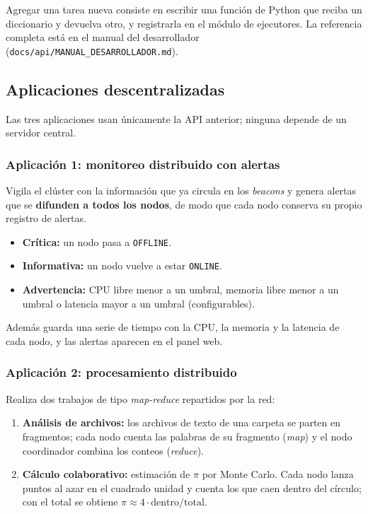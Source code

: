 \documentclass{article}
\begin{document}
Agregar una tarea nueva consiste en escribir una función de Python que reciba un diccionario y
devuelva otro, y registrarla en el módulo de ejecutores. La referencia completa está en el manual del
desarrollador (\texttt{docs/api/MANUAL\_DESARROLLADOR.md}).

\subsection{Aplicaciones descentralizadas}

Las tres aplicaciones usan únicamente la API anterior; ninguna depende de un servidor central.

\subsubsection{Aplicación 1: monitoreo distribuido con alertas}

Vigila el clúster con la información que ya circula en los \emph{beacons} y genera alertas que se
\textbf{difunden a todos los nodos}, de modo que cada nodo conserva su propio registro de alertas.

\begin{itemize}
\item \textbf{Crítica:} un nodo pasa a \texttt{OFFLINE}.
\item \textbf{Informativa:} un nodo vuelve a estar \texttt{ONLINE}.
\item \textbf{Advertencia:} CPU libre menor a un umbral, memoria libre menor a un umbral o latencia
mayor a un umbral (configurables).
\end{itemize}

Además guarda una serie de tiempo con la CPU, la memoria y la latencia de cada nodo, y las alertas
aparecen en el panel web.

\subsubsection{Aplicación 2: procesamiento distribuido}

Realiza dos trabajos de tipo \emph{map-reduce} repartidos por la red:

\begin{enumerate}
\item \textbf{Análisis de archivos:} los archivos de texto de una carpeta se parten en fragmentos; cada
nodo cuenta las palabras de su fragmento (\emph{map}) y el nodo coordinador combina los conteos
(\emph{reduce}).
\item \textbf{Cálculo colaborativo:} estimación de $\pi$ por Monte Carlo. Cada nodo lanza puntos al azar
en el cuadrado unidad y cuenta los que caen dentro del círculo; con el total se obtiene
$\pi \approx 4 \cdot \mathrm{dentro} / \mathrm{total}$.
\end{enumerate}
\end{document}
